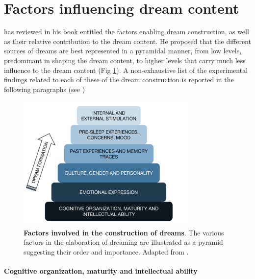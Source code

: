 \section{Factors influencing dream content}
\label{sec:dream-content:factors}

\citet{de_koninck_sleep_2012} has reviewed in his book entitled  the factors enabling dream construction, as well as their relative contribution to the dream content. He proposed that the different sources of dreams are best represented in a pyramidal manner, from low levels, predominant in shaping the dream content, to higher levels that carry much less influence to the dream content (Fig \ref{fig:intro:koninck}). A non-exhaustive list of the experimental findings related to each of these  of the dream construction is reported in the following paragraphs (see \citealp{blagrove_trait_2010, schredl_characteristics_2010, ruby_experimental_2011, de_koninck_sleep_2012})

\begin{figure}[htb]
	\centering
	\includegraphics[width=0.8\textwidth]{Fig/Intro/Intro_Pyramid_dream_construction/Intro_pyramid_dream.png}
	\caption[Factors involved in the construction of dreams]{\textbf{Factors involved in the construction of dreams}. The various factors in the elaboration of dreaming are illustrated as a pyramid suggesting their order and importance. Adapted from \citet{de_koninck_sleep_2012}.}
	\label{fig:intro:koninck}
\end{figure}


\paragraph{Cognitive organization, maturity and intellectual ability}

